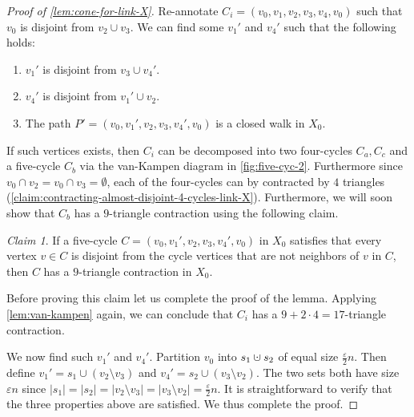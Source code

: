 \documentclass[10pt,a4paper]{article}
\newcommand{\prettyref}[1]{\cref{#1}}
\theoremstyle{definition}
\theoremstyle{remark}
\newtheorem{claim}[theorem]{Claim}
\newcommand{\abs}[1]{\lvert#1\rvert}
\numberwithin{equation}{section}
\newcommand{\dunion}{\mathbin{\mathaccent\cdot\cup}}
\let\pref=\prettyref
\begin{document}
\begin{proof}[Proof of \pref{lem:cone-for-link-X}]
    Re-annotate \(C_i=(v_0,v_1,v_2,v_3,v_4,v_0)\) such that \(v_0\) is disjoint from \(v_2 \cup v_3\).
    We can find some \(v_1'\) and \(v_4'\) such that the following holds:
    \begin{enumerate}
        \item $v_1'$ is disjoint from $v_3\cup v_4'$.
        \item $v_4'$ is disjoint from $v_1'\cup v_2$.
        \item The path \(P'=(v_0,v_1',v_2,v_3,v_4',v_0)\) is a closed walk in \(X_0\).
    \end{enumerate}
    If such vertices exists, then $C_i$ can be decomposed into two four-cycles $C_a, C_c$ and a five-cycle $C_b$ via the van-Kampen diagram in \pref{fig:five-cyc-2}. Furthermore since $v_0\cap v_2 = v_0\cap v_3 = \emptyset$, each of the four-cycles can by contracted by $4$ triangles (\pref{claim:contracting-almost-disjoint-4-cycles-link-X}). Furthermore, we will soon show that $C_b$ has a $9$-triangle contraction using the following claim.
    \begin{claim}\label{claim:disjoint-five-cycle}
       If a five-cycle $C = (v_0,v_1',v_2,v_3,v_4',v_0)$ in $X_0$ satisfies that every vertex $v \in C$ is disjoint from the cycle vertices that are not neighbors of $v$ in $C$, then $C$ has a $9$-triangle contraction in $X_0$.
    \end{claim}
    Before proving this claim let us complete the proof of the lemma.
    Applying \pref{lem:van-kampen} again, we can conclude that $C_i$ has a $9+ 2\cdot 4 = 17$-triangle contraction. 

    We now find such $v_1'$ and $v_4'$. Partition $v_0$ into $s_1\dunion s_2$ of equal size $\frac{\varepsilon}{2}n$. Then define $v_1' = s_1  \cup (v_2\setminus v_3)$ and $v_4' = s_2 \cup (v_3\setminus v_2) $. The two sets both have size $\varepsilon n$ since $\abs{s_1} = \abs{s_2} = \abs{v_2\setminus v_3} = \abs{v_3\setminus v_2} = \frac{\varepsilon}{2}n$. It is straightforward to verify that the three properties above are satisfied. We thus complete the proof. 



\end{proof}
\end{document}

